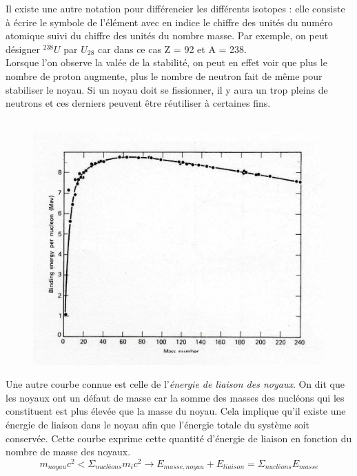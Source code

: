 Il existe une autre notation pour différencier les différents isotopes : elle consiste à écrire le symbole
de l'élément avec en indice le chiffre des unités du numéro atomique suivi du chiffre des unités du nombre
masse. Par exemple, on peut désigner $ ^{238}U$ par $U_{28}$ car dans ce cas Z = 92 et A = 238.\\

Lorsque l'on observe la valée de la stabilité, on peut en effet voir que plus le nombre de 
proton augmente, plus le nombre de neutron fait de même pour stabiliser le noyau. Si un 
noyau doit se fissionner, il y aura un trop pleins de neutrons et ces derniers peuvent 
être réutiliser à certaines fins.\\ 
\\


	\begin{figure}
	\vspace{-8mm}
	\includegraphics[scale=0.1]{ch1/image2.png}
	\end{figure}
Une autre courbe connue est celle de l'\textit{énergie de liaison des noyaux}. 
On dit que les noyaux ont un défaut de masse car la somme des masses des nucléons
qui les constituent est plus élevée que la masse du noyau.
Cela implique qu'il existe une énergie de liaison dans le noyau afin que l'énergie
totale du système soit conservée. Cette courbe exprime cette quantité d'énergie
de liaison en fonction du nombre de masse des noyaux.\\

\begin{equation}
m_{noyau} c^2 < \Sigma_{nucléons} m_i c^2 \rightarrow E_{masse, noyau} + E_{liaison} = \Sigma_{nucléons} E_{masse}
\end{equation}


